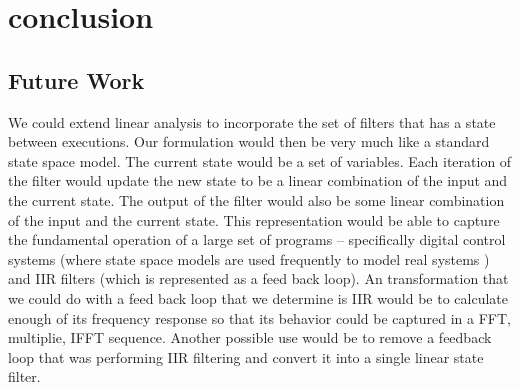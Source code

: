 \section{conclusion}


\subsection{Future Work}
We could extend linear analysis to incorporate the set of filters
that has a state between executions. Our formulation would then be very
much like a standard state space model. The current state would be a set of
variables. Each iteration of the filter would update the new state to be
a linear combination of the input and the current state. The output of the 
filter would also be some linear combination of the input and the current state.
This representation would be able to capture the fundamental operation of
a large set of programs -- specifically digital control systems (where state
space models are used frequently to model real systems ) and IIR filters (which
is represented as a feed back loop). An transformation that we could do with 
a feed back loop that we determine is IIR would be to calculate enough of its
frequency response so that its behavior could be captured in a FFT, multiplie,
IFFT sequence. Another possible use would be to remove a feedback loop that was
performing IIR filtering and convert it into a single linear state filter.  
